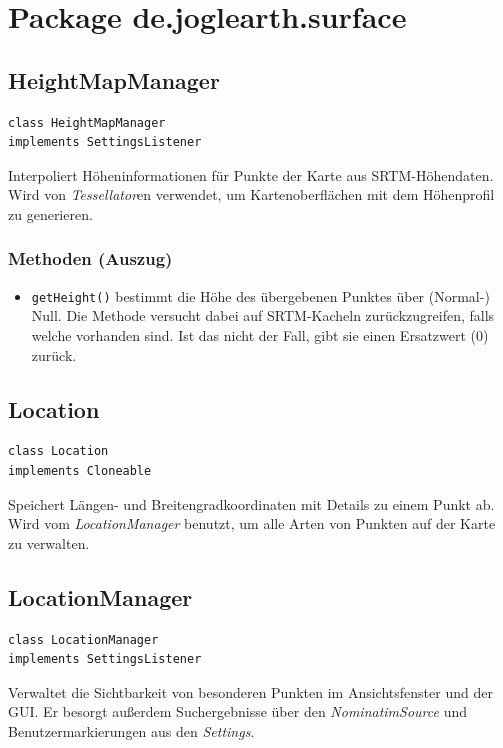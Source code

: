 \documentclass[10pt]{scrreprt}
\begin{document}
\vspace{5mm}
\section{Package de.joglearth.surface}
\subsection*{HeightMapManager}
\begin{lstlisting}
class HeightMapManager
implements SettingsListener
\end{lstlisting}
Interpoliert Höheninformationen für Punkte der Karte aus SRTM-Höhendaten. Wird von \textit{Tessellator}en verwendet, um Kartenoberflächen mit dem Höhenprofil zu generieren.\\
\subsubsection*{Methoden (Auszug)}
\begin{itemize}
\item\texttt{getHeight()} bestimmt die Höhe des übergebenen Punktes über (Normal-) Null. Die Methode versucht dabei auf SRTM-Kacheln zurückzugreifen, falls welche vorhanden sind. Ist das nicht der Fall, gibt sie einen Ersatzwert (0) zurück.
\end{itemize}

\vspace{5mm}
\subsection*{Location}
\begin{lstlisting}
class Location
implements Cloneable
\end{lstlisting}
Speichert Längen- und Breitengradkoordinaten mit Details zu einem Punkt ab. Wird vom \textit{LocationManager} benutzt, um alle Arten von Punkten auf der Karte zu verwalten.\\

\vspace{5mm}
\subsection*{LocationManager}
\begin{lstlisting}
class LocationManager
implements SettingsListener
\end{lstlisting}
Verwaltet die Sichtbarkeit von besonderen Punkten im Ansichtsfenster und der GUI. Er besorgt außerdem Suchergebnisse über den \textit{NominatimSource} und Benutzermarkierungen aus den \textit{Settings}.\\
\end{document}
